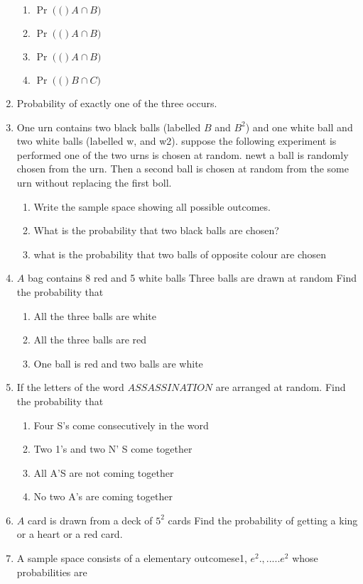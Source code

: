 \documentclass[12pt]{article}
\providecommand{\pr}[1]{\ensuremath{\Pr\left(#1\right)}}
\begin{document}
\begin{enumerate}
\begin{enumerate}
\item $\pr(A\cap B)$
\item $\pr(A\cap B)$
\item $\pr(A\cap B)$
\item $\pr(B\cap C)$
\end{enumerate}
\item Probability of exactly one of the three occurs.
\item One urn contains two black balls (labelled $B$ and $B^2$) and one white ball and two white balls (labelled w, and w2). suppose the following experiment is performed one of the two urns is chosen at random. newt a ball is randomly chosen from the urn. Then a second ball is chosen at random from the some urn without replacing the first boll.
	\begin{enumerate}
\item Write the sample space showing all possible outcomes.
\item What is the probability that two black balls are chosen?
\item what is the probability that two balls of opposite colour are chosen
	\end{enumerate}
\item $A$ bag contains 8 red and 5 white balls Three balls are drawn at random Find the probability that
	\begin{enumerate}
\item All the three balls are white\item All the three balls are red
\item One ball is red and two balls are white
	\end{enumerate}
\item If the letters of the word $ASSASSINATION$ are arranged at random. Find the probability that
	\begin{enumerate}
\item Four S's come consecutively in the word
\item Two 1's and two N' S  come together
\item All A'S are not coming together
\item No two A's are coming together
	\end{enumerate}
\item $A$ card is drawn from a deck of $5^2$ cards Find the probability of getting a king or a heart or a red card.
\item A sample space consists of a elementary outcomese1, $e^2.,.....e^2$ whose probabilities are
	\begin{align}

\end{align}
\end{enumerate}
\end{document}
